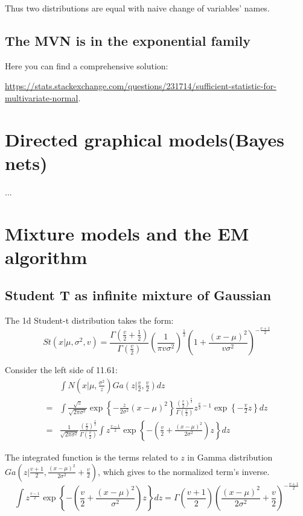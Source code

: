 \documentclass[UTF8]{ctexart}
\begin{document}
Thus two distributions are equal with naive change of variables' names.

\subsection{The MVN is in the exponential family}
Here you can find a comprehensive solution:

\url{https://stats.stackexchange.com/questions/231714/sufficient-statistic-for-multivariate-normal}.

\newpage
\section{Directed graphical models(Bayes nets)}
...

\newpage
\section{Mixture models and the EM algorithm}
\subsection{Student T as infinite mixture of Gaussian}
The 1d Student-t distribution takes the form:
$$St(x|\mu,\sigma^{2},v)=\frac{\Gamma(\frac{v}{2}+\frac{1}{2})}{\Gamma(\frac{v}{2})}(\frac{1}{\pi v \sigma^{2}})^{\frac{1}{2}}(1+\frac{(x-\mu)^{2}}{v\sigma^{2}})^{-\frac{v+1}{2}}$$

Consider the left side of 11.61:
\begin{align}
 & \int N(x|\mu,\frac{\sigma^{2}}{z})Ga(z|\frac{v}{2},\frac{v}{2})dz \nonumber \\
=&\int \frac{\sqrt{z}}{\sqrt{2\pi\sigma^{2}}}\exp\left\{ -\frac{z}{2\sigma^{2}}(x-\mu)^{2} \right\}\frac{(\frac{v}{2})^{\frac{v}{2}}}{\Gamma(\frac{v}{2})}z^{\frac{v}{2}-1}\exp\left\{ -\frac{v}{2}z \right\}dz \nonumber \\
=&\frac{1}{\sqrt{2\pi \sigma^{2}}}\frac{(\frac{v}{2})^{\frac{v}{2}}}{\Gamma(\frac{v}{2})}\int z^{\frac{v-1}{2}}\exp\left\{ -(\frac{v}{2}+\frac{(x-\mu)^{2}}{2\sigma^{2}})z \right\} dz \nonumber
\end{align}

The integrated function is the terms related to $z$ in Gamma distribution $Ga(z|\frac{v+1}{2},\frac{(x-\mu)^{2}}{2\sigma^{2}}+\frac{v}{2})$, which gives to the normalized term's inverse.
$$\int z^{\frac{v-1}{2}}\exp\left\{ -(\frac{v}{2}+\frac{(x-\mu)^{2}}{\sigma^{2}})z \right\} dz = \Gamma(\frac{v+1}{2})(\frac{(x-\mu)^{2}}{2\sigma^{2}}+\frac{v}{2})^{-\frac{v+1}{2}}$$
\end{document}
